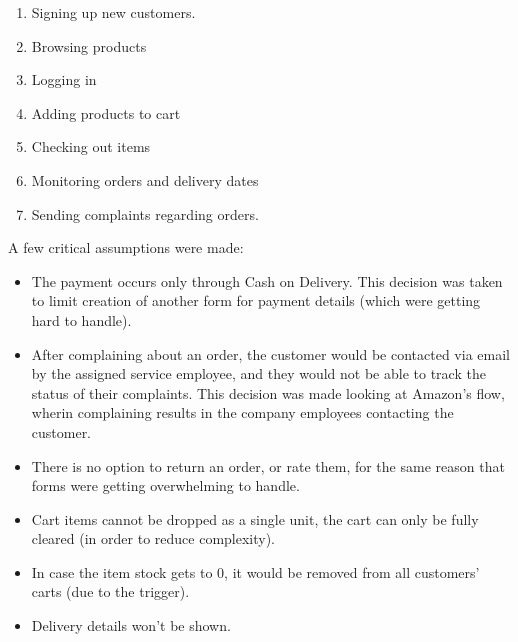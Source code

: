 \documentclass[12pt]{report}
\begin{document}
        \begin{enumerate}
            \item Signing up new customers.
            \item Browsing products
            \item Logging in
            \item Adding products to cart
            \item Checking out items
            \item Monitoring orders and delivery dates
            \item Sending complaints regarding orders.
        \end{enumerate}
    A few critical assumptions were made:
    \\
        \begin{itemize}
            \item The payment occurs only through Cash on Delivery. This decision was taken to limit creation of another form for payment details (which were getting hard to handle).
            \item After complaining about an order, the customer would be contacted via email by the assigned service employee, and they would not be able to track the status of their complaints. This decision was made looking at Amazon's flow, wherin complaining results in the company employees contacting the customer.
            \item There is no option to return an order, or rate them, for the same reason that forms were getting overwhelming to handle.
            \item Cart items cannot be dropped as a single unit, the cart can only be fully cleared (in order to reduce complexity).
            \item In case the item stock gets to 0, it would be removed from all customers' carts (due to the trigger).
            \item Delivery details won't be shown.
        \end{itemize}
    

   
\end{document}
